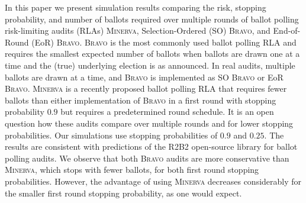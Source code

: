 \documentclass{beamer}
\newcommand{\Minerva}{\textsc{Minerva}\xspace}
\newcommand{\BRAVO}{\textsc{Bravo}\xspace}
\begin{document}
\begin{frame}
    In this paper we present simulation results comparing the risk, stopping probability, and number of ballots required over multiple rounds of ballot polling risk-limiting audits (RLAs) \Minerva, Selection-Ordered (SO) \BRAVO, and End-of-Round (EoR) \BRAVO.    
    \BRAVO is the most commonly used ballot polling RLA and requires the smallest expected number of ballots when ballots are drawn one at a time and the (true) underlying election is as announced. 
    In real audits, multiple ballots are drawn at a time, and \BRAVO is implemented as SO \BRAVO or EoR \BRAVO. 
    \Minerva is a recently proposed ballot polling RLA that requires fewer ballots than either implementation of \BRAVO in a first round with stopping probability $0.9$ but requires a predetermined round schedule.
    It is an open question how these audits compare over multiple rounds and for lower stopping probabilities. 
    Our simulations use stopping probabilities of $0.9$ and $0.25$.
    The results are consistent with predictions of the R2B2 open-source library for ballot polling audits. 
    We observe that both \BRAVO audits are more conservative than \Minerva, which stops with fewer ballots, for both first round stopping probabilities. 
    However, the advantage of using \Minerva decreases considerably for the smaller first round stopping probability, as one would expect. 

\end{frame}
%
%
\end{document}
